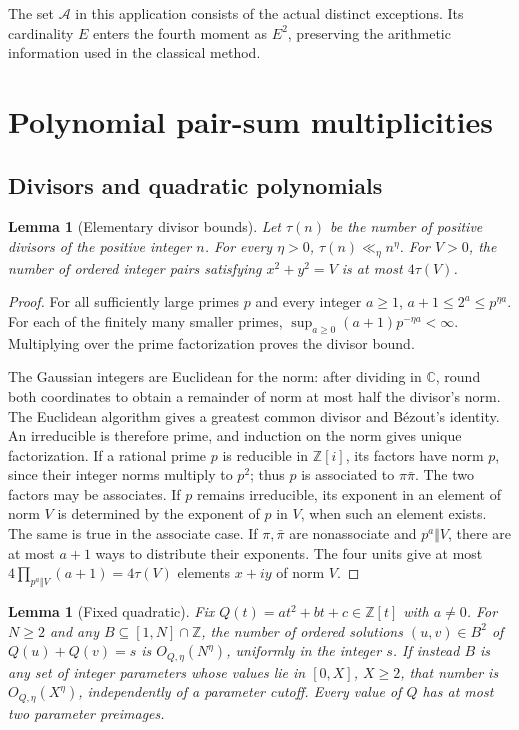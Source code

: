 \documentclass[11pt]{article}
\newtheorem{lemma}[theorem]{Lemma}
\theoremstyle{definition}
\theoremstyle{remark}
\numberwithin{equation}{section}
\newcommand{\Z}{\mathbb Z}
\newcommand{\C}{\mathbb C}
\newcommand{\A}{\mathcal A}
\begin{document}
The set $\A$ in this application consists of the actual distinct
exceptions. Its cardinality $E$ enters the fourth moment as $E^2$,
preserving the arithmetic information used in the classical method.

\section{Polynomial pair-sum multiplicities}\label{sec:multiplicities}

\subsection{Divisors and quadratic polynomials}

\begin{lemma}[Elementary divisor bounds]\label{lem:divisors}
Let $\tau(n)$ be the number of positive divisors of the positive integer
$n$. For every $\eta>0$, $\tau(n)\ll_\eta n^\eta$.
For $V>0$, the number of ordered integer pairs satisfying
$x^2+y^2=V$ is at most $4\tau(V)$.
\end{lemma}

\begin{proof}
For all sufficiently large primes $p$ and every integer $a\ge1$,
$a+1\le2^a\le p^{\eta a}$. For each of the finitely many smaller
primes, $\sup_{a\ge0}(a+1)p^{-\eta a}<\infty$. Multiplying over the
prime factorization proves the divisor bound.

The Gaussian integers are Euclidean for the norm: after dividing in
$\C$, round both coordinates to obtain a remainder of norm at most
half the divisor's norm. The Euclidean algorithm gives a greatest
common divisor and B\'ezout's identity. An irreducible is therefore
prime, and induction on the norm gives unique factorization.
If a rational prime $p$ is reducible in $\Z[i]$, its factors have
norm $p$, since their integer norms multiply to $p^2$; thus
$p$ is associated to $\pi\bar\pi$. The two factors may be associates.
If $p$ remains irreducible, its exponent in an element of norm $V$
is determined by the exponent of $p$ in $V$, when such an element
exists. The same is true in the associate case. If $\pi,\bar\pi$
are nonassociate and $p^a\Vert V$, there are at most $a+1$ ways to
distribute their exponents. The four units give at most
$4\prod_{p^a\Vert V}(a+1)=4\tau(V)$ elements $x+iy$ of norm $V$.
\end{proof}

\begin{lemma}[Fixed quadratic]\label{lem:quadratic}
Fix $Q(t)=at^2+bt+c\in\Z[t]$ with $a\ne0$.
For $N\ge2$ and any $B\subseteq[1,N]\cap\Z$, the number of ordered
solutions $(u,v)\in B^2$ of $Q(u)+Q(v)=s$ is
$O_{Q,\eta}(N^\eta)$, uniformly in the integer $s$.
If instead $B$ is any set of integer parameters whose values lie
in $[0,X]$, $X\ge2$, that number is $O_{Q,\eta}(X^\eta)$,
independently of a parameter cutoff. Every value of $Q$ has at
most two parameter preimages.
\end{lemma}
\end{document}
